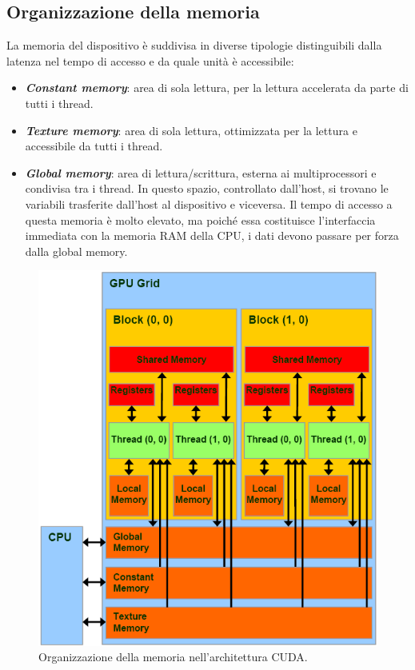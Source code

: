 \subsection{Organizzazione della memoria}
\noindent La memoria del dispositivo è suddivisa in diverse tipologie distinguibili dalla latenza nel tempo di accesso e da quale unità è accessibile:
\begin{itemize}
    \item \textit{\textbf{Constant memory}}: area di sola lettura, per la lettura accelerata da parte di tutti i thread.
    \item \textit{\textbf{Texture memory}}: area di sola lettura, ottimizzata per la lettura e accessibile da tutti i thread.
    \item \textit{\textbf{Global memory}}: area di lettura/scrittura, esterna ai multiprocessori e condivisa tra i thread. In questo spazio, controllato dall'host, si trovano le variabili trasferite dall'host al dispositivo e viceversa. Il tempo di accesso a questa memoria è molto elevato, ma poiché essa costituisce l'interfaccia immediata con la memoria RAM della CPU, i dati devono passare per forza dalla global memory.
\end{itemize}
\begin{figure}[h!]
    \centering
    \includegraphics[scale=0.4]{img/CUDA-memory-model.png}
    \caption{Organizzazione della memoria nell'architettura CUDA.}
    \label{fig:cuda_memory_model}
\end{figure}

